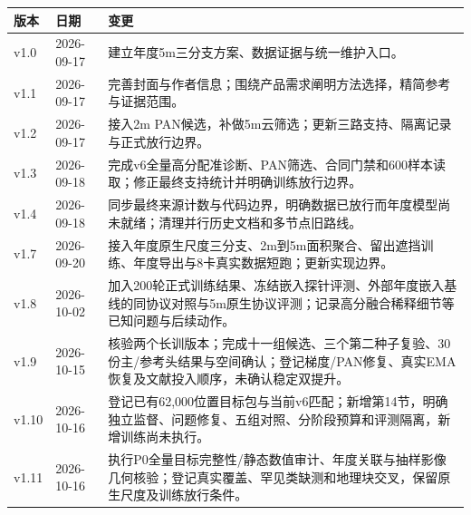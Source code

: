 \documentclass[UTF8,fontset=fandol,zihao=5,a4paper]{ctexart}
\newcommand{\reportpage}{\clearpage}
\begin{document}
\noindent\begin{tabularx}{\linewidth}{@{}p{2cm}p{2.8cm}Y@{}}
\toprule 版本 & 日期 & 变更\\\midrule
v1.0 & 2026-09-17 & 建立年度5m三分支方案、数据证据与统一维护入口。\\
v1.1 & 2026-09-17 & 完善封面与作者信息；围绕产品需求阐明方法选择，精简参考与证据范围。\\
v1.2 & 2026-09-17 & 接入2m PAN候选，补做5m云筛选；更新三路支持、隔离记录与正式放行边界。\\
v1.3 & 2026-09-18 & 完成v6全量高分配准诊断、PAN筛选、合同门禁和600样本读取；修正最终支持统计并明确训练放行边界。\\
v1.4 & 2026-09-18 & 同步最终来源计数与代码边界，明确数据已放行而年度模型尚未就绪；清理并行历史文档和多节点旧路线。\\
v1.7 & 2026-09-20 & 接入年度原生尺度三分支、2m到5m面积聚合、留出遮挡训练、年度导出与8卡真实数据短跑；更新实现边界。\\
v1.8 & 2026-10-02 & 加入200轮正式训练结果、冻结嵌入探针评测、外部年度嵌入基线的同协议对照与5m原生协议评测；记录高分融合稀释细节等已知问题与后续动作。\\
v1.9 & 2026-10-15 & 核验两个长训版本；完成十一组候选、三个第二种子复验、30份主/参考头结果与空间确认；登记梯度/PAN修复、真实EMA恢复及文献投入顺序，未确认稳定双提升。\\
v1.10 & 2026-10-16 & 登记已有62{,}000位置目标包与当前v6匹配；新增第14节，明确独立监督、问题修复、五组对照、分阶段预算和评测隔离，新增训练尚未执行。\\
v1.11 & 2026-10-16 & 执行P0全量目标完整性/静态数值审计、年度关联与抽样影像几何核验；登记真实覆盖、罕见类缺测和地理块交叉，保留原生尺度及训练放行条件。\\
\bottomrule\end{tabularx}
\reportpage
\end{document}
